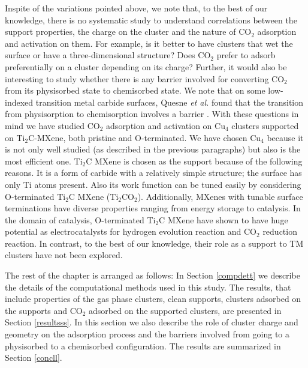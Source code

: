  
 Inspite of the variations pointed above, we note that, to the best of our knowledge, there is no
 systematic study to understand correlations between the support properties, the charge on the cluster
 and the nature of CO$_2$ adsorption and activation on them. For example, is it better to have clusters
 that wet the surface or have a three-dimensional structure? Does CO$_2$ prefer to adsorb preferentially on
 a cluster depending on its charge? Further, it would also be interesting to study whether there
 is any barrier involved for converting CO$_2$ from its physisorbed state to chemisorbed state. We note that on
 some low-indexed transition metal carbide surfaces, Quesne  \textit{et al.} found that the transition from physisorption to chemisorption involves a barrier \cite{quesne2019carbon}.
  With these questions in mind we have studied CO$_2$ adsorption and activation on Cu$_4$ clusters supported on Ti$_2$C-MXene, both pristine and O-terminated. We have chosen Cu$_4$ because it is not only well studied (as described in the previous paragraphs) but also is the most efficient one\cite{tao2019best}.
 Ti$_2$C MXene is chosen as the support because of the following reasons. It is a form of carbide with a relatively
 simple structure; the surface has only Ti atoms present. Also its work function can be tuned easily by considering
 O-terminated Ti$_2$C MXene (Ti$_2$CO$_2$). Additionally, MXenes with tunable surface terminations have diverse 
 properties ranging from energy storage\cite{anasori20172d} to catalysis\cite{li20192d, zhang2017ti, li2015heterogeneous}. In the domain of catalysis, O-terminated  Ti$_2$C MXene have shown to have huge potential as electrocatalysts for hydrogen evolution reaction\cite{gao20162d} and CO$_{2}$ reduction reaction\cite{li2015heterogeneous}. In contrast, to the best of our knowledge, their role as a support to TM clusters have not been explored.
 
 The rest of the chapter is arranged as follows: In Section \ref{compdett} we describe the details of the
 computational methods used in this study. The results, that include properties of the gas phase clusters,
 clean supports, clusters adsorbed on the supports and CO$_2$ adsorbed on the supported clusters, are presented
 in Section \ref{resultsss}. In this section we also describe the role of cluster charge and geometry on the adsorption
 process and the barriers involved from going to a physisorbed to a chemisorbed configuration. The results
 are summarized in Section \ref{concll}.


